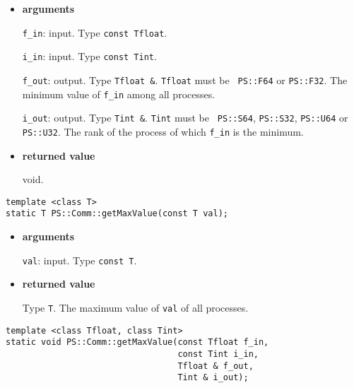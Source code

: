 \begin{itemize}

\item{\bf arguments}

{\tt f\_in}: input. Type {\tt const Tfloat}.

{\tt i\_in}: input. Type {\tt const Tint}.

{\tt f\_out}: output. Type {\tt Tfloat \&}. {\tt Tfloat} must be {\tt
PS::F64} or {\tt PS::F32}. The minimum value of {\tt f\_in} among all
processes.

{\tt i\_out}: output. Type {\tt Tint \&}. {\tt Tint} must be {\tt
PS::S64}, {\tt PS::S32}, {\tt PS::U64} or {\tt PS::U32}. The rank of
the process of which {\tt f\_in} is the minimum.






\item{\bf returned value}

void.

\end{itemize}


\begin{screen}
\begin{verbatim}
template <class T>
static T PS::Comm::getMaxValue(const T val);
\end{verbatim}
\end{screen}

\begin{itemize}

\item{\bf arguments}

{\tt val}: input. Type {\tt const T}.

\item{\bf returned value}

Type {\tt T}. The maximum value of {\tt val} of all processes.

\end{itemize}

\begin{screen}
\begin{verbatim}
template <class Tfloat, class Tint>
static void PS::Comm::getMaxValue(const Tfloat f_in,
                                  const Tint i_in,
                                  Tfloat & f_out,
                                  Tint & i_out);
\end{verbatim}
\end{screen}

